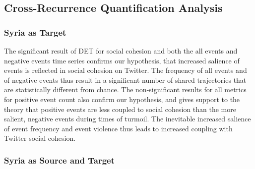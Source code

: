 \documentclass[english,man]{apa6}
\begin{document}
\hypertarget{cross-recurrence-quantification-analysis-2}{%
\subsection{Cross-Recurrence Quantification Analysis}\label{cross-recurrence-quantification-analysis-2}}

\hypertarget{syria-as-target-2}{%
\subsubsection{Syria as Target}\label{syria-as-target-2}}

The significant result of DET for social cohesion and both the all events and negative events time series confirms our hypothesis, that increased salience of events is reflected in social cohesion on Twitter. The frequency of all events and of negative events thus result in a significant number of shared trajectories that are statistically different from chance. The non-significant results for all metrics for positive event count also confirm our hypothesis, and gives support to the theory that positive events are less coupled to social cohesion than the more salient, negative events during times of turmoil. The inevitable increased salience of event frequency and event violence thus leads to increased coupling with Twitter social cohesion.

\hypertarget{syria-as-source-and-target-2}{%
\subsubsection{Syria as Source and Target}\label{syria-as-source-and-target-2}}
\end{document}
